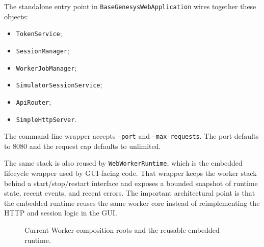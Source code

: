 The standalone entry point in \texttt{BaseGenesysWebApplication} wires together
these objects:
\begin{itemize}
\item \texttt{TokenService};
\item \texttt{SessionManager};
\item \texttt{WorkerJobManager};
\item \texttt{SimulatorSessionService};
\item \texttt{ApiRouter};
\item \texttt{SimpleHttpServer}.
\end{itemize}
The command-line wrapper accepts \texttt{--port} and \texttt{--max-requests}.
The port defaults to 8080 and the request cap defaults to unlimited.

The same stack is also reused by \texttt{WebWorkerRuntime}, which is the embedded lifecycle wrapper used by GUI-facing code. That wrapper keeps the worker stack behind a start/stop/restart interface and exposes a bounded snapshot of runtime state, recent events, and recent errors. The important architectural point is that the embedded runtime reuses the same worker core instead of reimplementing the HTTP and session logic in the GUI.

\begin{figure}[htbp]
\centering
\caption{Current Worker composition roots and the reusable embedded runtime.}
\label{fig:worker-architecture-runtime-map}
\end{figure}


